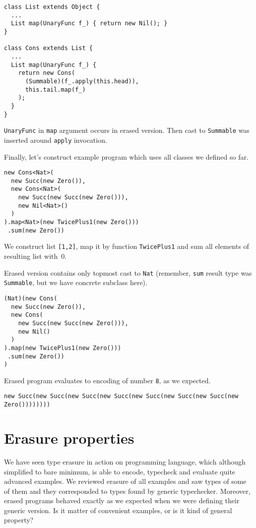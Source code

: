 \documentclass{article}[12pt]
\begin{document}
\begin{verbatim}
class List extends Object {
  ...
  List map(UnaryFunc f_) { return new Nil(); }
}

class Cons extends List {
  ...
  List map(UnaryFunc f_) {
    return new Cons(
      (Summable)(f_.apply(this.head)),
      this.tail.map(f_)
    );     
  }
}
\end{verbatim}

\texttt{UnaryFunc} in \texttt{map} argument occurs in erased
version. Then cast to \texttt{Summable} was inserted around
\texttt{apply} invocation.

Finally, let's construct example program which uses all classes
we defined so far.

\begin{verbatim}
new Cons<Nat>(
  new Succ(new Zero()),
  new Cons<Nat>(
    new Succ(new Succ(new Zero())),
    new Nil<Nat>()
  )
).map<Nat>(new TwicePlus1(new Zero()))
 .sum(new Zero())
\end{verbatim}

We construct list \texttt{[1,2]}, map it by function
\texttt{TwicePlus1} and sum all elements of resulting list
with~0.

Erased version contains only topmost cast to \texttt{Nat}
(remember, \texttt{sum} result type was \texttt{Summable},
but we have concrete subclass here).

\begin{verbatim}
(Nat)(new Cons(
  new Succ(new Zero()),
  new Cons(
    new Succ(new Succ(new Zero())),
    new Nil()
  )
).map(new TwicePlus1(new Zero()))
 .sum(new Zero())
)
\end{verbatim}

Erased program evaluates to encoding of number \texttt{8},
as we expected.

\begin{verbatim}
new Succ(new Succ(new Succ(new Succ(new Succ(new Succ(new Succ(new Zero())))))))
\end{verbatim}


\section{Erasure properties}

We have seen type erasure in action on programming language,
which although simplified to bare minimum, is able to encode,
typecheck and evaluate quite advanced examples. We reviewed
erasure of all examples and saw types of some of them and
they corresponded to types found by generic typechecker. Moreover,
erased programs behaved exactly as we expected when we were
defining their generic version. Is it matter of convenient
examples, or is it kind of general property?
\end{document}

